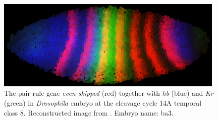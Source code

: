 \documentclass[12pt,a4paper,twoside,openright]{book}
\begin{document}
\begin{figure}
\centering
\includegraphics[width=0.99\textwidth]{img/drosophila}
\caption[Drosophila Melanogaster embryo at the cleavage cycle 14A temporal class 8]{The pair-rule gene  \emph{even-skipped} (red) together with \emph{hb} (blue) and \emph{Kr} (green) in \emph{Drosophila} embryo at the cleavage cycle 14A temporal class 8. Reconstructed image from \cite{flyex2009}. Embryo name: ba3. }
\label{fig:drosophila}       %
\end{figure}
\end{document}
